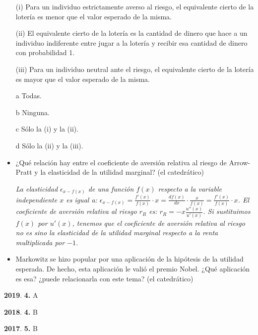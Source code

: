 \documentclass{nuevotema}
\begin{document}
\begin{enumerate}
	\item[(i)] Para un individuo estrictamente averso al riesgo, el equivalente cierto de la lotería es menor que el valor esperado de la misma.
	\item[(ii)] El equivalente cierto de la lotería es la cantidad de dinero que hace a un individuo indiferente entre jugar a la lotería y recibir esa cantidad de dinero con probabilidad 1.
	\item[(iii)] Para un individuo neutral ante el riesgo, el equivalente cierto de la lotería es mayor que el valor esperado de la misma.
\end{enumerate}

\begin{enumerate}
	\item[a] Todas.
	\item[b] Ninguna.
	\item[c] Sólo la (i) y la (ii).
	\item[d] Sólo la (ii) y la (iii).
\end{enumerate}

\begin{itemize}
    \item ¿Qué relación hay entre el coeficiente de aversión relativa al riesgo de Arrow-Pratt y la elasticidad de la utilidad marginal? (el catedrático)
    
    \textit{La elasticidad $\epsilon_{x-f(x)}$ de una función $f(x)$ respecto a la variable independiente $x$ es igual a: $\epsilon_{x-f(x)} = \frac{f'(x)}{f(x)} \cdot x = \frac{df(x)}{dx} \cdot \frac{x}{f(x)} = \frac{f'(x)}{f(x)} \cdot x$. El coeficiente de aversión relativa al riesgo $r_R$ es: $r_R = -x \frac{u''(x)}{u'(x)}$. Si sustituimos $f(x)$ por $u'(x)$, tenemos que el coeficiente de aversión relativa al riesgo no es sino la elasticidad de la utilidad marginal respecto a la renta multiplicada por $-1$. }
    
    \item Markowitz se hizo popular por una aplicación de la hipótesis de la utilidad esperada. De hecho, esta aplicación le valió el premio Nobel. ¿Qué aplicación es esa? ¿puede relacionarla con este tema? (el catedrático)
\end{itemize}

\notas

\textbf{2019}. \textbf{4.} A

\textbf{2018}. \textbf{4.} B

\textbf{2017}. \textbf{5.} B
\end{document}
